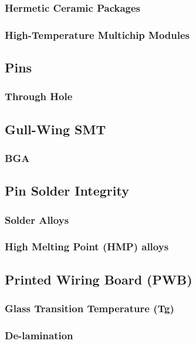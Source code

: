 \documentclass{article}
\begin{document}
		\subsubsection{Hermetic Ceramic Packages}
		\subsubsection{High-Temperature Multichip Modules}
	
	\subsection{Pins}
		\subsubsection{Through Hole}
		\subsection{Gull-Wing SMT}
		\subsubsection{BGA}
	
	\subsection{Pin Solder Integrity}
		\subsubsection{Solder Alloys}
		
		\subsubsection{High Melting Point (HMP) alloys}
	
	\subsection{Printed Wiring Board (PWB)}
		\subsubsection{Glass Transition Temperature (Tg)}
		\subsubsection{De-lamination}
\end{document}
